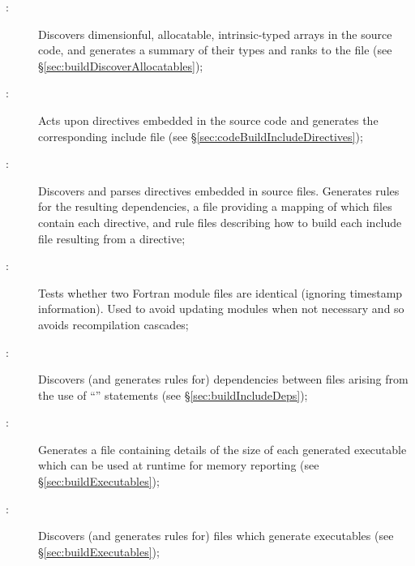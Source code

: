 \begin{description}

\item[:] Discovers dimensionful, allocatable, intrinsic-typed arrays in the source code, and generates a summary of their types and ranks to the file  (see \S\ref{sec:buildDiscoverAllocatables});
  
\item[:] Acts upon  directives embedded in the source code and generates the corresponding include file (see \S\ref{sec:codeBuildIncludeDirectives});

\item[:] Discovers and parses directives embedded in source files. Generates  rules for the resulting dependencies, a file providing a mapping of which files contain each directive, and rule files describing how to build each include file resulting from a  directive;

\item[:] Tests whether two Fortran module files are identical (ignoring timestamp information). Used to avoid updating modules when not necessary and so avoids recompilation cascades;

\item[:] Discovers (and generates rules for) dependencies between files arising from the use of ``'' statements (see \S\ref{sec:buildIncludeDeps});
  
\item[:] Generates a file containing details of the size of each generated executable which can be used at runtime for memory reporting (see \S\ref{sec:buildExecutables});

\item[:] Discovers (and generates rules for) files which generate executables (see \S\ref{sec:buildExecutables});


\end{description}
